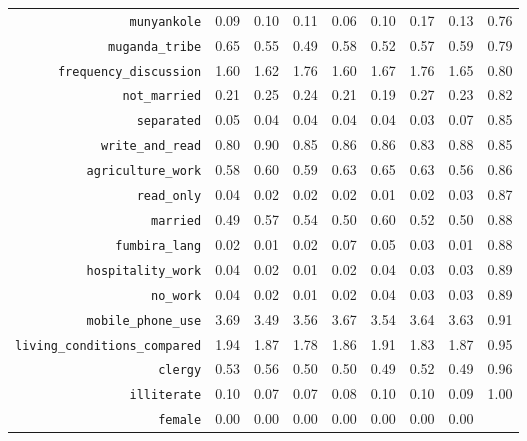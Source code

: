 \begin{longtable}{rrrrrrrrr}
  {\texttt{munyankole}} & 0.09 & 0.10 & 0.11 & 0.06 & 0.10 & 0.17 & 0.13 & 0.76 \\ 
  {\texttt{muganda\_tribe}} & 0.65 & 0.55 & 0.49 & 0.58 & 0.52 & 0.57 & 0.59 & 0.79 \\ 
  {\texttt{frequency\_discussion}} & 1.60 & 1.62 & 1.76 & 1.60 & 1.67 & 1.76 & 1.65 & 0.80 \\ 
  {\texttt{not\_married}} & 0.21 & 0.25 & 0.24 & 0.21 & 0.19 & 0.27 & 0.23 & 0.82 \\ 
  {\texttt{separated}} & 0.05 & 0.04 & 0.04 & 0.04 & 0.04 & 0.03 & 0.07 & 0.85 \\ 
  {\texttt{write\_and\_read}} & 0.80 & 0.90 & 0.85 & 0.86 & 0.86 & 0.83 & 0.88 & 0.85 \\ 
  {\texttt{agriculture\_work}} & 0.58 & 0.60 & 0.59 & 0.63 & 0.65 & 0.63 & 0.56 & 0.86 \\ 
  {\texttt{read\_only}} & 0.04 & 0.02 & 0.02 & 0.02 & 0.01 & 0.02 & 0.03 & 0.87 \\ 
  {\texttt{married}} & 0.49 & 0.57 & 0.54 & 0.50 & 0.60 & 0.52 & 0.50 & 0.88 \\ 
  {\texttt{fumbira\_lang}} & 0.02 & 0.01 & 0.02 & 0.07 & 0.05 & 0.03 & 0.01 & 0.88 \\ 
  {\texttt{hospitality\_work}} & 0.04 & 0.02 & 0.01 & 0.02 & 0.04 & 0.03 & 0.03 & 0.89 \\ 
  {\texttt{no\_work}} & 0.04 & 0.02 & 0.01 & 0.02 & 0.04 & 0.03 & 0.03 & 0.89 \\ 
  {\texttt{mobile\_phone\_use}} & 3.69 & 3.49 & 3.56 & 3.67 & 3.54 & 3.64 & 3.63 & 0.91 \\ 
  {\texttt{living\_conditions\_compared}} & 1.94 & 1.87 & 1.78 & 1.86 & 1.91 & 1.83 & 1.87 & 0.95 \\ 
  {\texttt{clergy}} & 0.53 & 0.56 & 0.50 & 0.50 & 0.49 & 0.52 & 0.49 & 0.96 \\ 
  {\texttt{illiterate}} & 0.10 & 0.07 & 0.07 & 0.08 & 0.10 & 0.10 & 0.09 & 1.00 \\ 
  {\texttt{female}} & 0.00 & 0.00 & 0.00 & 0.00 & 0.00 & 0.00 & 0.00 &  \\ 
   \hline
\hline
\end{longtable}
